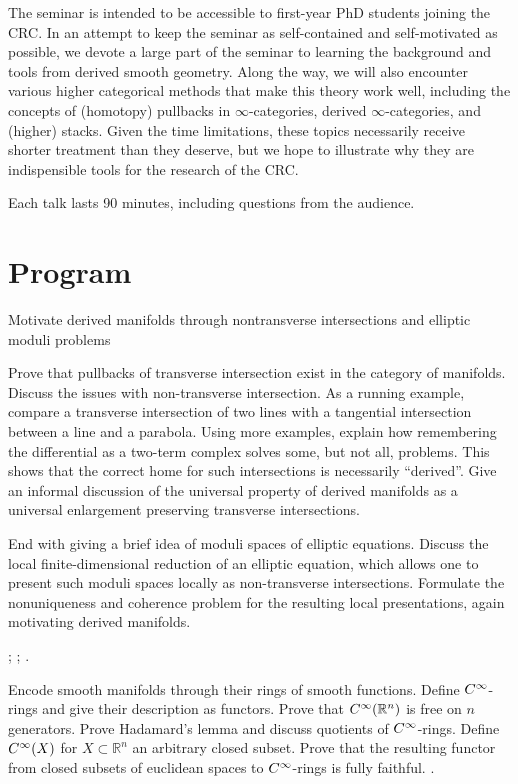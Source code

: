 \documentclass[11pt,a4paper]{book}
\begin{document}
The seminar is intended to be accessible to first-year PhD students joining the CRC. In an attempt to keep the seminar as self-contained and self-motivated as possible, we devote a large part of the seminar to learning the background and tools from derived smooth geometry. Along the way, we will also encounter various higher categorical methods that make this theory work well, including the concepts of (homotopy) pullbacks in $\infty$-categories, derived $\infty$-categories, and (higher) stacks. Given the time limitations, these topics necessarily receive shorter treatment than they deserve, but we hope to illustrate why they are indispensible tools for the research of the CRC.

Each talk lasts 90 minutes, including questions from the audience.

\section*{Program}

{Motivate derived manifolds through nontransverse intersections and elliptic moduli problems}
{Prove that pullbacks of transverse intersection exist in the category of manifolds. Discuss the issues with non-transverse intersection. As a running example, compare a transverse intersection of two lines with a tangential intersection between a line and a parabola. Using more examples, explain how remembering the differential as a two-term complex solves some, but not all, problems. This shows that the correct home for such intersections is necessarily ``derived''. Give an informal discussion of the universal property of derived manifolds as a universal enlargement preserving transverse intersections.
	
	End with giving a brief idea of moduli spaces of elliptic equations. Discuss the local finite-dimensional reduction of an
	elliptic equation, which allows one to present such moduli spaces locally as non-transverse intersections. Formulate the nonuniqueness and coherence problem for the resulting local presentations, again motivating derived manifolds.}
{\textcite[Section~1]{Spivak_Derived_Smooth_Manifolds};
	\textcite[Chapter~1, especially Section~1.0.1]{Steffens_Derived_Differential_Geometry};
	\textcite[Sections~1--2]{Pardon_Representability_Elliptic_Fredholm}.}

{Encode smooth manifolds through their rings of smooth functions.}
{Define $C^\infty$-rings and give their description as functors. Prove that $C^\infty(\mathbb R^n)$ is free on
	$n$ generators. Prove Hadamard's lemma and discuss quotients of $C^\infty$-rings. Define $C^\infty(X)$ for $X\subset \mathbb R^n$ an arbitrary closed subset. Prove that the resulting functor from closed subsets of euclidean spaces to $C^\infty$-rings is fully faithful.}
{\textcite[Chapter~I, Section~1]{Moerdijk_Reyes_Smooth_Infinitesimal_Analysis}.}
\end{document}
